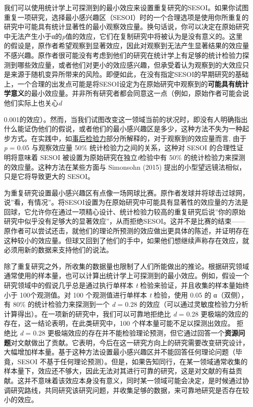 \documentclass[
  letterpaper,
  DIV=11,
  numbers=noendperiod]{scrreprt}
\begin{document}
我们可以使用统计学上可探测到的最小效应来设置重复研究的SESOI。如果你试图重复一项研究，选择最小感兴趣区（SESOI）时的一个合理选项是使用你所重复的研究中可能具有统计显著性的最小观察效应量。换句话说，你可以决定在原始研究中无法产生小于α的\emph{p}值的效应，它们在复制研究中将被认为是没有意义的。这里的假设是，原作者希望观察到显著效应，因此对观察到无法产生显著结果的效应量不感兴趣。原作者很可能没有考虑到他们的研究在统计学上有足够的统计检验力探测到哪些效应量，或者他们对更小的效应感兴趣，但承受着认为观察到的大效应只是来源于随机变异所带来的风险。即便如此，在没有指定SESOI的早期研究的基础上，一个合理的出发点可能是将SESOI设定为在原始研究中观察到的\textbf{可能具有统计学意义}的最小效应量。并非所有研究者都会同意这一点（例如，原始作者可能会说他们实际上也关心\emph{d}

0.001的效应）。然而，当我们试图改变这一领域当前的状况时，即没有人明确指出什么能证伪他们的假说，或者他们的最小感兴趣区是多少，这种方法不失为一种起步方式。在实践中，如\protect\hyperlink{posthoc}{事后检验力}部分所解释的，对于观察到的效应量而言,
由于\emph{p} = 0.05 与观察效应量 50\% 统计检验力之间的关系，这种对 SESOI
的合理性证明将意味着 SESOI 被设置为原始研究在独立\emph{t}检验中有 50\%
的统计检验力来探测的效应量。这种方法在某些方面与 Simonsohn (2015)
提出的小型望远镜法相似，只是它将导致更大的 SESOI。

为重复研究设置最小感兴趣区有点像一场网球比赛。原作者发球并将球击过球网，说''看，有情况''。将SESOI设置为在原始研究中可能具有显著性的效应量的方法是回球，它允许你在通过一项精心设计、统计检验力较高的重复研究后说''你的原始研究中似乎没有足够大的显著效应''，从而拒绝SESOI。这并不是比赛的结束------原作者可以尝试还击，就他们的理论所预测的效应做出更具体的陈述，并证明存在这种较小的效应量。但球又回到了他们的手中，如果他们想继续声称存在效应，就必须用新的数据来支持他们的说法。

除了重复研究之外，所收集的数据量也限制了人们所能做出的推论。根据研究领域通常使用的样本量，也可以计算出统计学上可探测到的最小效应。例如，假设一个研究领域中的假说几乎总是通过执行单样本
\emph{t} 检验来验证，并且收集的样本量始终小于 100个观测值。对 100
个观测值进行单样本 \emph{t} 检验，使用 0.05 的 α（双侧），有 80\%
的统计检验力来探测到一个 \emph{d} = 0.28
的效应（可以通过灵敏度检验力分析计算得出）。在一项新的研究中，我们可以可靠地拒绝比
\emph{d} = 0.28 更极端的效应的存在，这一结论表明，在此类研究中，100
个样本量可能不足以探测出效应。 拒绝比 \emph{d} = 0.28
更极端效应的存在并不能检验理论预测，但它通过回答一个\textbf{资源问题}对文献做出了贡献。它表明，今后在这一研究方向上的研究需要改变研究设计，大幅增加样本量。基于这种方法设置最小感兴趣区并不能回答任何理论问题（毕竟，SESOI
不基于任何理论预测）。但是，如果告知同行，在某一领域通常收集的样本量下，效应还不够大，因此无法对其进行可靠的研究，这是对文献的有益贡献。这并不意味着该效应本身没有意义，同时某一领域可能会决定，是时候通过协调研究路线，共同研究该研究问题，并收集足够的数据，来可靠地研究是否存在较小的效应。
\end{document}
